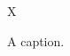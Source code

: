 \documentclass{article}
\begin{document}
\begin{figure}\centering X\caption{A caption.}\end{figure}
\end{document}
